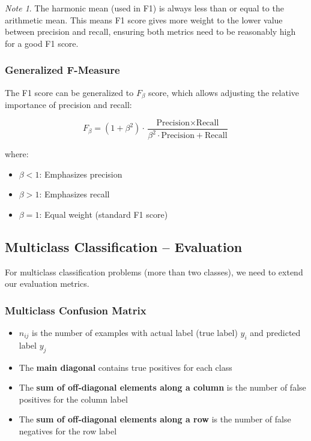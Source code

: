 \documentclass[11pt,a4paper]{article}
\theoremstyle{definition}
\theoremstyle{plain}
\theoremstyle{remark}
\newtheorem*{remark}{Note}
\begin{document}
\begin{remark}
The harmonic mean (used in F1) is always less than or equal to the arithmetic mean. This means F1 score gives more weight to the lower value between precision and recall, ensuring both metrics need to be reasonably high for a good F1 score.
\end{remark}

\subsubsection{Generalized F-Measure}

The F1 score can be generalized to $F_\beta$ score, which allows adjusting the relative importance of precision and recall:

\begin{equation}
F_\beta = (1 + \beta^2) \cdot \frac{\text{Precision} \times \text{Recall}}{\beta^2 \cdot \text{Precision} + \text{Recall}}
\end{equation}

where:
\begin{itemize}
    \item $\beta < 1$: Emphasizes precision
    \item $\beta > 1$: Emphasizes recall
    \item $\beta = 1$: Equal weight (standard F1 score)
\end{itemize}

\subsection{Multiclass Classification -- Evaluation}

For multiclass classification problems (more than two classes), we need to extend our evaluation metrics.

\subsubsection{Multiclass Confusion Matrix}

\begin{itemize}
    \item $n_{ij}$ is the number of examples with actual label (true label) $y_i$ and predicted label $y_j$
    \item The \textbf{main diagonal} contains true positives for each class
    \item The \textbf{sum of off-diagonal elements along a column} is the number of false positives for the column label
    \item The \textbf{sum of off-diagonal elements along a row} is the number of false negatives for the row label
\end{itemize}
\end{document}

